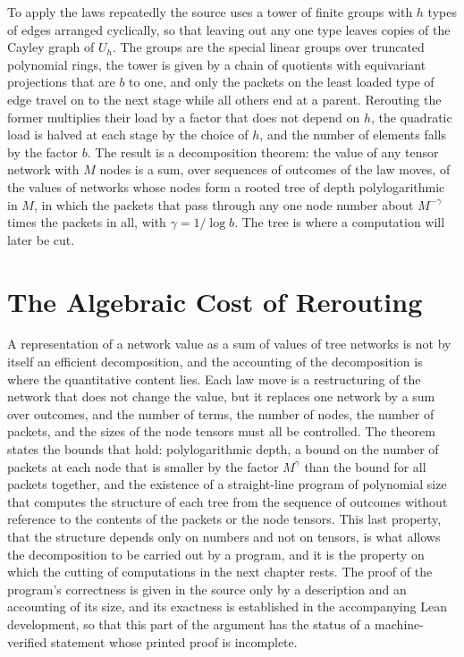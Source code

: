 \documentclass[11pt,letterpaper]{report}
\theoremstyle{plain}
\theoremstyle{definition}
\theoremstyle{remark}
\begin{document}
To apply the laws repeatedly the source uses a tower of finite groups with $h$ types of edges arranged cyclically, so that leaving out any one type leaves copies of the Cayley graph of $U_h$. The groups are the special linear groups over truncated polynomial rings, the tower is given by a chain of quotients with equivariant projections that are $b$ to one, and only the packets on the least loaded type of edge travel on to the next stage while all others end at a parent. Rerouting the former multiplies their load by a factor that does not depend on $h$, the quadratic load is halved at each stage by the choice of $h$, and the number of elements falls by the factor $b$. The result is a decomposition theorem: the value of any tensor network with $M$ nodes is a sum, over sequences of outcomes of the law moves, of the values of networks whose nodes form a rooted tree of depth polylogarithmic in $M$, in which the packets that pass through any one node number about $M^{-\gamma}$ times the packets in all, with $\gamma=1/\log b$. The tree is where a computation will later be cut.

\section{The Algebraic Cost of Rerouting}

A representation of a network value as a sum of values of tree networks is not by itself an efficient decomposition, and the accounting of the decomposition is where the quantitative content lies. Each law move is a restructuring of the network that does not change the value, but it replaces one network by a sum over outcomes, and the number of terms, the number of nodes, the number of packets, and the sizes of the node tensors must all be controlled. The theorem states the bounds that hold: polylogarithmic depth, a bound on the number of packets at each node that is smaller by the factor $M^{\gamma}$ than the bound for all packets together, and the existence of a straight-line program of polynomial size that computes the structure of each tree from the sequence of outcomes without reference to the contents of the packets or the node tensors. This last property, that the structure depends only on numbers and not on tensors, is what allows the decomposition to be carried out by a program, and it is the property on which the cutting of computations in the next chapter rests. The proof of the program's correctness is given in the source only by a description and an accounting of its size, and its exactness is established in the accompanying Lean development, so that this part of the argument has the status of a machine-verified statement whose printed proof is incomplete.
\end{document}
